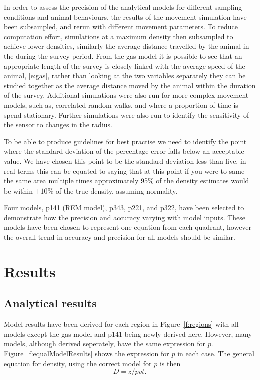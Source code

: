 \documentclass[a4paper,10pt,reqno,oneside]{amsart}
\begin{document}
In order to assess the precision of the analytical models for different sampling conditions and animal behaviours, the results of the movement simulation have been subsampled, and rerun with different movement parameters. To reduce computation effort, simulations at a maximum density then subsampled to achieve lower densities,  similarly the average distance travelled by the animal in the during the survey period. From the gas model it is possible to see that an appropriate length of the survey is closely linked with the average speed of the animal, \ref{e:gas}, rather than looking at the two variables separately they can be studied together as the average distance moved by the animal within the duration of the survey. Additional simulations were also run for more complex movement models, such as, correlated random walks, and where a proportion of time is spend stationary. Further simulations were also run to identify the sensitivity of the sensor to changes in the radius.

To be able to produce guidelines for best practise we need to identify the point where the standard deviation of the percentage error falls below an acceptable value. We have chosen this point to be the standard deviation less than five, in real terms this can be equated to saying that at this point if you were to same the same area multiple times approximately 95\% of the density estimates would be within $\pm10\%$ of the true density, assuming normality. 

Four models, p141 (REM model), p343, p221, and p322, have been selected to demonstrate how the precision and accuracy varying with model inputs. These models have been chosen to represent one equation from each quadrant, however the overall trend in accuracy and precision for all models should be similar.


\section{Results}

\subsection{Analytical results}

Model results have been derived for each region in Figure~\ref{f:regions} with all models except the gas model and p141 being newly derived here. However, many models, although derived seperately, have the same expression for $p$. Figure~\ref{f:equalModelResults} shows the expression for $p$ in each case. The general equation for density, using the correct model for $p$ is then
\begin{equation}
\label{e:D}
	D = z/pvt.
\end{equation}
\end{document}
